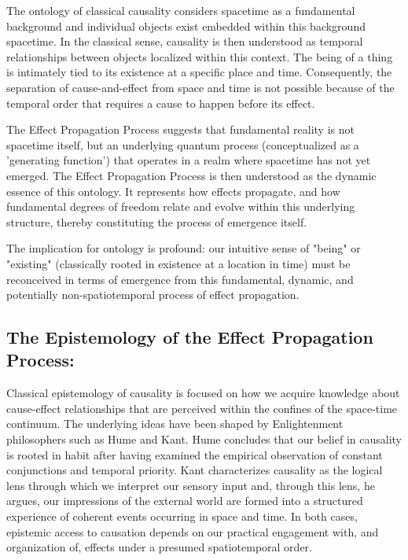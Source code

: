 \documentclass{article}
\begin{document}
The ontology of classical causality considers spacetime as a fundamental background and individual objects exist embedded within this background spacetime. In the classical sense, causality is then understood as temporal relationships between objects localized within this context. The being of a thing is intimately tied to its existence at a specific place and time. Consequently, the separation of cause-and-effect from space and time is not possible because of the temporal order that requires a cause to happen before its effect.

The Effect Propagation Process suggests that fundamental reality is not spacetime itself, but an underlying quantum process (conceptualized as a 'generating function') that operates in a realm where spacetime has not yet emerged. The Effect Propagation Process is then understood as the dynamic essence of this ontology. It represents how effects propagate, and how fundamental degrees of freedom relate and evolve within this underlying structure, thereby constituting the process of emergence itself.

The implication for ontology is profound: our intuitive sense of "being" or "existing" (classically rooted in existence at a location in time) must be reconceived in terms of emergence from this fundamental, dynamic, and potentially non-spatiotemporal process of effect propagation.


\subsection{The Epistemology of the Effect Propagation Process:}
\label{subsec:epp_epistemology}

Classical epistemology of causality is focused on how we acquire knowledge about cause-effect relationships that are perceived within the confines of the space-time continuum. The underlying ideas have been shaped by Enlightenment philosophers such as Hume and Kant.
Hume concludes that our belief in causality is rooted in habit after having examined the empirical observation of constant conjunctions and temporal priority.
Kant characterizes causality as the logical lens through which we interpret our sensory input and, through this lens, he argues, our impressions of the external world are formed into a structured experience of coherent events occurring in space and time.
In both cases, epistemic access to causation depends on our practical engagement with, and organization of, effects under a presumed spatiotemporal order.
\end{document}

